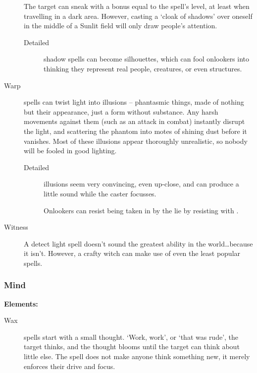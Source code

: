 \begin{multicols}{2}
\begin{description}
    The target can sneak with a bonus equal to the spell's level, at least when travelling in a dark area.
    However, casting a `cloak of shadows' over oneself in the middle of a Sunlit field will only draw people's attention.
    \begin{description}
      \item[Detailed]
        shadow spells can become silhouettes, which can fool onlookers into thinking they represent real people, creatures, or even structures.
    \end{description}
  \item[Warp]
    spells can twist light into illusions -- phantasmic things, made of nothing but their appearance, just a form without substance.
    Any harsh movements against them (such as an attack in combat) instantly disrupt the light, and scattering the phantom into motes of shining dust before it vanishes.
    Most of these illusions appear thoroughly unrealistic, so nobody will be fooled in good lighting.
    \begin{description}
      \item[Detailed]
        illusions seem very convincing, even up-close, and can produce a little sound while the caster focusses.

        Onlookers can resist being taken in by the lie by resisting with .
    \end{description}
  \item[Witness]
    A detect light spell doesn't sound the greatest ability in the world\ldots because it isn't.
    However, a crafty witch can make use of even the least popular spells.
\end{description}

\subsubsection{Mind}

\textbf{Elements:}

\begin{description}
  \item[Wax]
    spells start with a small thought.
    `Work, work', or `that was rude', the target thinks, and the thought blooms until the target can think about little else.
    The spell does not make anyone think something new, it merely enforces their drive and focus.


\end{description}
\end{multicols}
